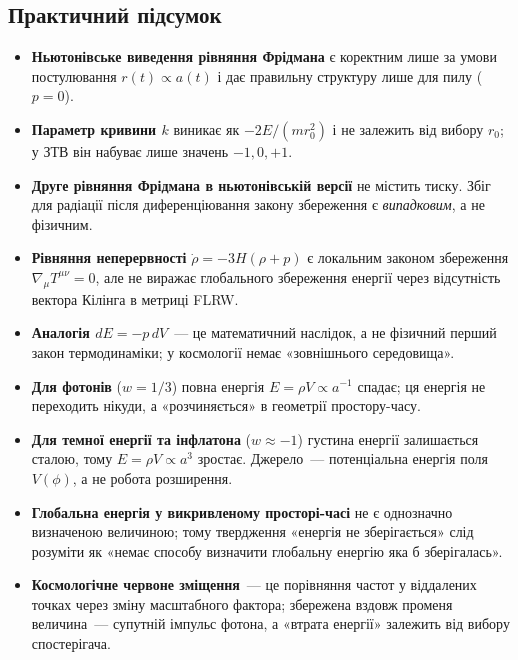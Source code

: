 \subsection*{Практичний підсумок}

\begin{itemize}
    \item \textbf{Ньютонівське виведення рівняння Фрідмана}
          є коректним лише за умови постулювання
          $r(t) \propto a(t)$ і дає правильну структуру
          лише для пилу ($p=0$).
    \item \textbf{Параметр кривини $k$} виникає як
          $-2E/(mr_0^2)$ і не залежить від вибору $r_0$;
          у ЗТВ він набуває лише значень $-1, 0, +1$.
    \item \textbf{Друге рівняння Фрідмана в ньютонівській
          версії} не містить тиску. Збіг для радіації
          після диференціювання закону збереження є
          \emph{випадковим}, а не фізичним.
    \item \textbf{Рівняння неперервності}
          $\dot\rho = -3H(\rho+p)$ є локальним законом
          збереження $\nabla_\mu T^{\mu\nu}=0$, але не
          виражає глобального збереження енергії через
          відсутність вектора Кілінга в метриці FLRW.
    \item \textbf{Аналогія $dE = -p\,dV$}~--- це
          математичний наслідок, а не фізичний перший
          закон термодинаміки; у космології немає
          «зовнішнього середовища».
    \item \textbf{Для фотонів} ($w=1/3$) повна енергія
          $E = \rho V \propto a^{-1}$ спадає; ця енергія
          не переходить нікуди, а «розчиняється» в
          геометрії простору-часу.
    \item \textbf{Для темної енергії та інфлатона}
          ($w\approx -1$) густина енергії залишається
          сталою, тому $E = \rho V \propto a^3$ зростає.
          Джерело~--- потенціальна енергія поля $V(\phi)$,
          а не робота розширення.
    \item \textbf{Глобальна енергія у викривленому
          просторі-часі} не є однозначно визначеною
          величиною; тому твердження «енергія не
          зберігається» слід розуміти як «немає способу
          визначити глобальну енергію яка б зберігалась».
    \item \textbf{Космологічне червоне зміщення}~--- це
          порівняння частот у віддалених точках через
          зміну масштабного фактора; збережена вздовж променя
          величина~--- супутній імпульс фотона, а «втрата
          енергії» залежить від вибору спостерігача.
\end{itemize}
